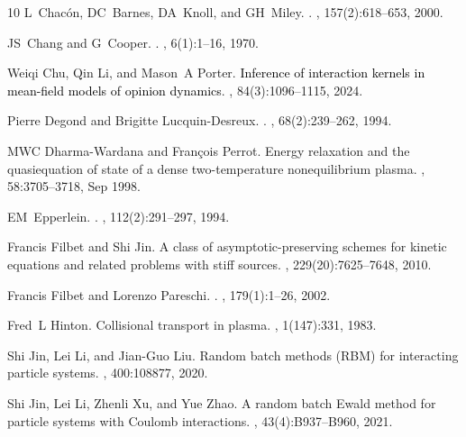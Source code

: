 \documentclass[preprint,1p,times]{elsarticle}
\theoremstyle{definition}
\theoremstyle{remark}
\newcommand{\tcr}[1]{\textcolor{black}{#1}}
\begin{document}
\begin{thebibliography}{10}
L~Chac{\'o}n, DC~Barnes, DA~Knoll, and GH~Miley.
.
, 157(2):618--653, 2000.

JS~Chang and G~Cooper.
.
, 6(1):1--16, 1970.

Weiqi Chu, Qin Li, and Mason~A Porter.
\newblock \tcr{Inference of interaction kernels in mean-field models of opinion
  dynamics}.
, 84(3):1096--1115, 2024.

Pierre Degond and Brigitte Lucquin-Desreux.
.
, 68(2):239--262, 1994.

MWC Dharma-Wardana and Fran{\c{c}}ois Perrot.
\newblock Energy relaxation and the quasiequation of state of a dense
  two-temperature nonequilibrium plasma.
, 58:3705--3718, Sep 1998.

EM~Epperlein.
.
, 112(2):291--297, 1994.

Francis Filbet and Shi Jin.
\newblock A class of asymptotic-preserving schemes for kinetic equations and
  related problems with stiff sources.
, 229(20):7625--7648, 2010.

Francis Filbet and Lorenzo Pareschi.
.
, 179(1):1--26, 2002.

Fred~L Hinton.
\newblock Collisional transport in plasma.
, 1(147):331, 1983.

Shi Jin, Lei Li, and Jian-Guo Liu.
\newblock Random batch methods ({RBM}) for interacting particle systems.
, 400:108877, 2020.

Shi Jin, Lei Li, Zhenli Xu, and Yue Zhao.
\newblock A random batch {E}wald method for particle systems with {C}oulomb
  interactions.
, 43(4):B937--B960, 2021.


\end{thebibliography}
\end{document}
